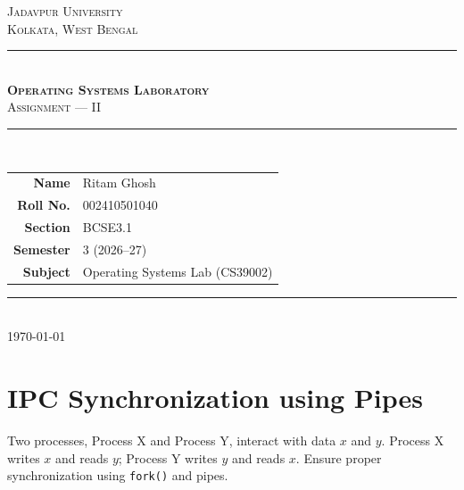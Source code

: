 \documentclass[11pt,a4paper]{article}
\title{}
\date{}
\author{}
\begin{document}
\thispagestyle{empty}
\begin{center}
\vspace*{1cm}

{\large\textsc{Jadavpur University}}\\[0.2cm]
{\normalsize\textsc{Kolkata, West Bengal}}\\[0.8cm]

{\color{rulegray}\rule{0.7\linewidth}{1pt}}\\[0.8cm]

{\LARGE\bfseries\textsc{Operating Systems Laboratory}}\\[0.4cm]
{\Large\textsc{Assignment --- II}}\\[0.8cm]

{\color{rulegray}\rule{0.7\linewidth}{1pt}}\\[1.2cm]

\begin{tabular}{rl}
\textbf{Name} & Ritam Ghosh \\[0.3cm]
\textbf{Roll No.} & 002410501040 \\[0.3cm]
\textbf{Section} & BCSE3.1 \\[0.3cm]
\textbf{Semester} & 3 (2026--27) \\[0.3cm]
\textbf{Subject} & Operating Systems Lab (CS39002) \\
\end{tabular}

\vfill

{\color{rulegray}\rule{0.7\linewidth}{1pt}}\\[0.3cm]
{\small\today}
\end{center}

\newpage
\setcounter{page}{1}

\section{IPC Synchronization using Pipes}

\begin{questionbox}
Two processes, Process X and Process Y, interact with data $x$ and $y$. Process X writes $x$ and reads $y$; Process Y writes $y$ and reads $x$. Ensure proper synchronization using \texttt{fork()} and pipes.
\end{questionbox}
\end{document}
